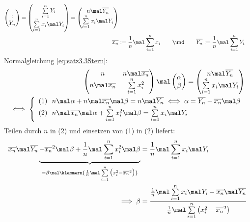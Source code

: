 \begin{beispiel}
\begin{align*}
\begin{pmatrix}
			\vdots\\
			Y_n
		\end{pmatrix}
		=\begin{pmatrix}
			\sum\limits_{i=1}^n Y_i\\
			\sum\limits_{i=1}^n x_i\mal Y_i
		\end{pmatrix}
		=\begin{pmatrix}
			n\mal\overline{Y_n}\\
			\sum\limits_{i=1}^n x_i\mal Y_i
		\end{pmatrix}\\
		\mit\qquad \overline{x_n}&:=\frac{1}{n}\mal\sum\limits_{i=1}^n x_i
		\qquad\und\qquad
		\overline{Y_n}:=\frac{1}{n}\mal\sum\limits_{i=1}^n Y_i
	\end{align*}
	Normalgleichung \eqref{eq:satz3.3Stern}:
	\begin{align*}
		\begin{pmatrix}
			n & n\mal\overline{x_n}\\
			n\mal\overline{x_n} & \sum\limits_{i=1}^n x_i^2
		\end{pmatrix}\mal\begin{pmatrix}
			\alpha\\
			\beta
		\end{pmatrix}=\begin{pmatrix}
			n\mal\overline{Y_n}\\
			\sum\limits_{i=1}^n x_i\mal Y_i
		\end{pmatrix}\\
		\iff
		\left\lbrace\begin{array}{l}
			(1)~~
			n\mal\alpha+n\mal\overline{x_n}\mal\beta=n\mal\overline{Y_n}
			\iff\alpha=\overline{Y_n}-\overline{x_n}\mal\beta\\
			(2)~~n\mal\overline{x_n}\mal\alpha+\sum\limits_{i=1}^n x_i^2\mal\beta=\sum\limits_{i=1}^n x_i\mal Y_i
		\end{array}\right.
	\end{align*}
	Teilen durch $n$ in (2) und einsetzen von (1) in (2) liefert:
	\begin{align*}
		\overline{x_n}\mal \overline{Y_n}\underbrace{-\overline{x_n}^2\mal\beta+\frac{1}{n}\mal\sum\limits_{i=1}^n x_i^2\mal\beta}_{
			=\beta\mal\klammern{\frac{1}{n}\mal\sum\limits_{i=1}^n \big(x_i^2-\overline{x_n}^2\big)}
		}
		&=\frac{1}{n}\mal\sum\limits_{i=1}^n x_i\mal Y_i\\
		\implies
		\beta
		&=\frac{
			\frac{1}{n}\mal\sum\limits_{i=1}^n x_i\mal Y_i-\overline{x_n}\mal\overline{Y_n}
		}{
			\frac{1}{n}\mal\sum\limits_{i=1}^n \big(x_i^2-\overline{x_n}^2\big)
}
\end{align*}
\end{beispiel}
